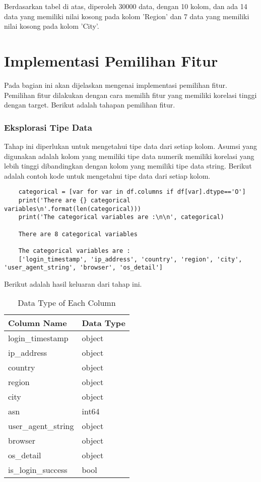     Berdasarkan tabel di atas, diperoleh 30000 data, dengan 10 kolom, dan ada 14 data yang memiliki nilai kosong pada kolom 'Region' dan 7 data yang memiliki nilai kosong pada kolom 'City'.


\section{Implementasi Pemilihan Fitur}
Pada bagian ini akan dijelaskan mengenai implementasi pemilihan fitur. Pemilihan fitur dilakukan dengan cara memilih fitur yang memiliki korelasi tinggi dengan target. Berikut adalah tahapan pemilihan fitur.

\subsubsection{Eksplorasi Tipe Data}
Tahap ini diperlukan untuk mengetahui tipe data dari setiap kolom. Asumsi yang digunakan adalah kolom yang memiliki tipe data numerik memiliki korelasi yang lebih tinggi dibandingkan dengan kolom yang memiliki tipe data string.
Berikut adalah contoh kode untuk mengetahui tipe data dari setiap kolom.

\begin{lstlisting}
    categorical = [var for var in df.columns if df[var].dtype=='O']
    print('There are {} categorical variables\n'.format(len(categorical)))
    print('The categorical variables are :\n\n', categorical)

    There are 8 categorical variables

    The categorical variables are :
    ['login_timestamp', 'ip_address', 'country', 'region', 'city', 'user_agent_string', 'browser', 'os_detail']
    \end{lstlisting}

    Berikut adalah hasil keluaran dari tahap ini.

    \begin{table}[H]
        \centering
        \begin{tabular}{|l|l|}
        \hline
        \textbf{Column Name} & \textbf{Data Type} \\ \hline
        login\_timestamp & object \\ 
        ip\_address & object \\ 
        country & object \\ 
        region & object \\ 
        city & object \\ 
        asn & int64 \\ 
        user\_agent\_string & object \\ 
        browser & object \\ 
        os\_detail & object \\ 
        is\_login\_success & bool \\ \hline
        \end{tabular}
        \caption{Data Type of Each Column}
        \label{tab:data_type}
        \end{table}

